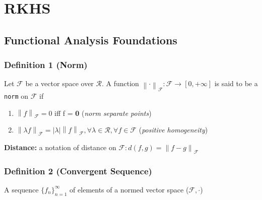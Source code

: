 \section{RKHS}

\subsection{Functional Analysis Foundations}

\subsubsection{Definition 1 (Norm)}

Let $\mathcal{F}$  be a vector space over $\mathcal{R}$. A function $\left\| \cdot \right\|_{\mathcal{F}}:\mathcal{F} \rightarrow [0, +\infty ]$  is said to be a \texttt{norm} on $\mathcal{F}$ if

\begin{enumerate}
    \item $\left\| f \right\|_{\mathcal{F}} = 0$ iff f = \textbf{0} (\textit{norm separate points})
    \item $\left\| \lambda f \right\|_{\mathcal{F}} = | \lambda | \left\| f \right\|_{\mathcal{F}}, \forall \lambda \in \mathcal{R}, \forall f \in \mathcal{F} $ (\textit{positive homogeneity})
\end{enumerate}
\textbf{Distance:} a notation of distance on $\mathcal{F}: d(f,g) =  \left\|f-g\right\|_\mathcal{F}$ 

\subsubsection{Definition 2 (Convergent Sequence)}
A sequence $\{f_n\}_{n=1}^{\infty}$ of elements of a normed vector space ($\mathcal{F}, \cdot$)